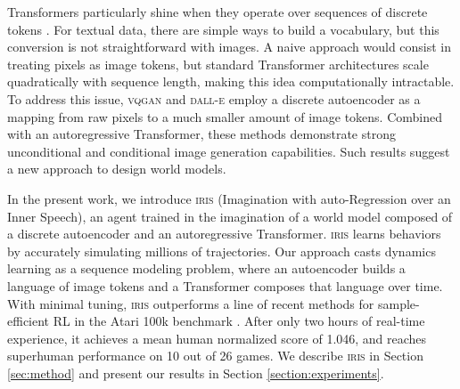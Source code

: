 Transformers particularly shine when they operate over sequences of discrete tokens \citep{bert, brown_gpt3}. For textual data, there are simple ways \citep{wordpiece, sentencepiece} to build a vocabulary, but this conversion is not straightforward with images. A naive approach would consist in treating pixels as image tokens, but standard Transformer architectures scale quadratically with sequence length, making this idea computationally intractable. To address this issue, \textsc{vqgan} \citep{vqgan} and \textsc{dall-e} \citep{ramesh} employ a discrete autoencoder \citep{vqvae} as a mapping from raw pixels to a much smaller amount of image tokens. Combined with an autoregressive Transformer, these methods demonstrate strong unconditional and conditional image generation capabilities. Such results suggest a new approach to design world models. 



In the present work, we introduce \textsc{iris} (Imagination with auto-Regression over an Inner Speech), an agent trained in the imagination of a world model composed of a discrete autoencoder and an autoregressive Transformer. \textsc{iris} learns behaviors by accurately simulating millions of trajectories. Our approach casts dynamics learning as a sequence modeling problem, where an autoencoder builds a language of image tokens and a Transformer composes that language over time. With minimal tuning, \textsc{iris} outperforms a line of recent methods \citep{simple, rainbow, curl, drq, spr} for sample-efficient RL in the Atari 100k benchmark \citep{simple}. After only two hours of real-time experience, it achieves a mean human normalized score of 1.046, and reaches superhuman performance on 10 out of 26 games. We describe \textsc{iris} in Section \ref{sec:method} and present our results in Section \nolinebreak \ref{section:experiments}.